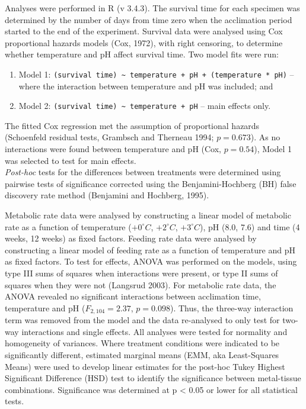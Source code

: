 \documentclass[oneside, a4paper]{memoir}
\providecommand{\tightlist}{%
  \setlength{\itemsep}{0pt}\setlength{\parskip}{0pt}}
\theoremstyle{definition}
\theoremstyle{definition}
\theoremstyle{definition}
\theoremstyle{remark}
\begin{document}
Analyses were performed in R (v 3.4.3). The survival time for each
specimen was determined by the number of days from time zero when the
acclimation period started to the end of the experiment. Survival data
were analysed using Cox proportional hazards models (Cox, 1972), with
right censoring, to determine whether temperature and pH affect survival
time. Two model fits were run:

\begin{enumerate}
\def\labelenumi{\arabic{enumi}.}
\tightlist
\item
  Model 1:
  \texttt{(survival\ time)\ \textasciitilde{}\ temperature\ +\ pH\ +\ (temperature\ *\ pH)}
  -- where the interaction between temperature and pH was included; and
\item
  Model 2:
  \texttt{(survival\ time)\ \textasciitilde{}\ temperature\ +\ pH} --
  main effects only.
\end{enumerate}

The fitted Cox regression met the assumption of proportional hazards
(Schoenfeld residual tests, Grambsch and Therneau 1994; \(p = 0.673\)).
As no interactions were found between temperature and pH (Cox,
\(p = 0.54\)), Model 1 was selected to test for main effects.\\
\emph{Post-hoc} tests for the differences between treatments were
determined using pairwise tests of significance corrected using the
Benjamini-Hochberg (BH) false discovery rate method (Benjamini and
Hochberg, 1995).

Metabolic rate data were analysed by constructing a linear model of
metabolic rate as a function of temperature (\(+0^{\circ}C\),
\(+2^{\circ}C\), \(+3^{\circ}C\)), pH (8.0, 7.6) and time (4 weeks, 12
weeks) as fixed factors. Feeding rate data were analysed by constructing
a linear model of feeding rate as a function of temperature and pH as
fixed factors. To test for effects, ANOVA was performed on the models,
using type III sums of squares when interactions were present, or type
II sums of squares when they were not (Langsrud 2003). For metabolic
rate data, the ANOVA revealed no significant interactions between
acclimation time, temperature and pH (\(F_{2,104}= 2.37\),
\(p = 0.098\)). Thus, the three-way interaction term was removed from
the model and the data re-analysed to only test for two-way interactions
and single effects. All analyses were tested for normality and
homogeneity of variances. Where treatment conditions were indicated to
be significantly different, estimated marginal means (EMM, aka
Least-Squares Means) were used to develop linear estimates for the
post-hoc Tukey Highest Significant Difference (HSD) test to identify the
significance between metal-tissue combinations. Significance was
determined at p \textless{} 0.05 or lower for all statistical tests.
\end{document}
